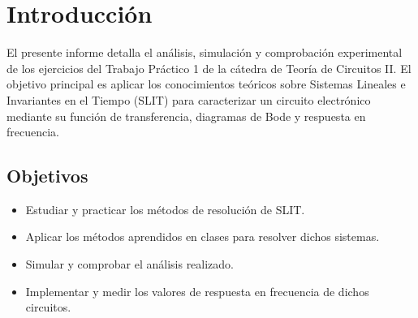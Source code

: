 \chapter{Introducción}

El presente informe detalla el análisis, simulación y comprobación experimental de los ejercicios del Trabajo
Práctico 1 de la cátedra de Teoría de Circuitos II. El objetivo principal es aplicar los conocimientos teóricos sobre
Sistemas Lineales e Invariantes en el Tiempo (SLIT) para caracterizar un circuito electrónico mediante su función de
transferencia, diagramas de Bode y respuesta en frecuencia.

\section{Objetivos}
\begin{itemize}
    \item Estudiar y practicar los métodos de resolución de SLIT.
    \item Aplicar los métodos aprendidos en clases para resolver dichos sistemas.
    \item Simular y comprobar el análisis realizado.
    \item Implementar y medir los valores de respuesta en frecuencia de dichos circuitos.
\end{itemize}
